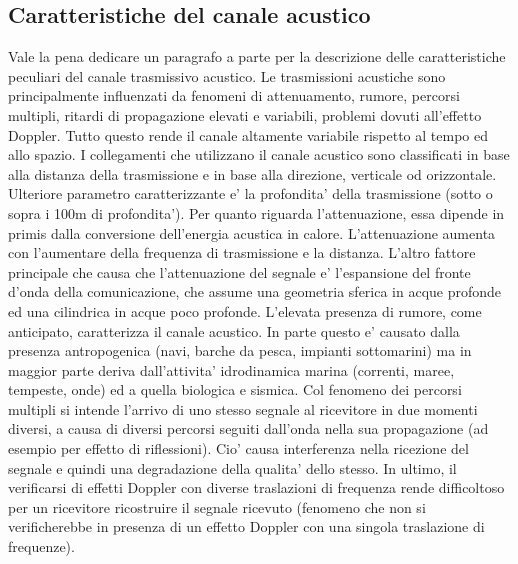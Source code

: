 \subsection{Caratteristiche del canale acustico}
Vale la pena dedicare un paragrafo a parte per la descrizione delle caratteristiche peculiari del canale trasmissivo acustico. Le trasmissioni acustiche sono principalmente influenzati da fenomeni di attenuamento, rumore, percorsi multipli, ritardi di propagazione elevati e variabili, problemi dovuti all'effetto Doppler.\newline
Tutto questo rende il canale altamente variabile rispetto al tempo ed allo spazio. I collegamenti che utilizzano il canale acustico sono classificati  in base alla distanza della trasmissione e in base alla direzione, verticale od orizzontale. Ulteriore parametro caratterizzante e' la profondita' della trasmissione (sotto o sopra i 100m di profondita').\newline
Per quanto riguarda l'attenuazione, essa dipende in primis dalla conversione dell'energia acustica in calore. L'attenuazione aumenta con l'aumentare della frequenza di trasmissione e la distanza. 
L'altro fattore principale che causa che l'attenuazione del segnale e' l'espansione del fronte d'onda della comunicazione, che assume una geometria sferica in acque profonde ed una cilindrica in acque poco profonde.\newline
L'elevata presenza di rumore, come anticipato, caratterizza il canale acustico. In parte questo e' causato dalla presenza antropogenica (navi, barche da pesca, impianti sottomarini) ma in maggior parte deriva dall'attivita' idrodinamica marina (correnti, maree, tempeste, onde) ed a quella biologica e sismica.\newline
Col fenomeno dei percorsi multipli si intende l'arrivo di uno stesso segnale al ricevitore in due momenti diversi, a causa di diversi percorsi seguiti dall'onda nella sua propagazione (ad esempio per effetto  di riflessioni). Cio' causa interferenza nella ricezione del segnale e quindi una degradazione della qualita' dello stesso.\newline
In ultimo, il verificarsi di effetti Doppler con diverse traslazioni di frequenza rende difficoltoso per un ricevitore ricostruire il segnale ricevuto (fenomeno che non si verificherebbe in presenza di un effetto Doppler con una singola traslazione di frequenze).

